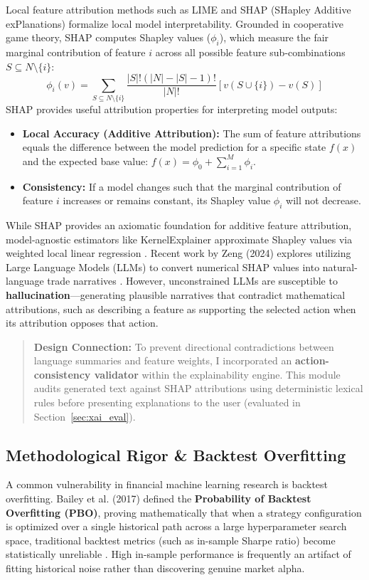 \documentclass[11pt,a4paper]{article}
\newenvironment{callout}{%
  \par\vspace{8pt}
  \noindent\makebox[\linewidth]{\rule{\linewidth}{0.6pt}}\vspace{-4pt}
  \begin{quote}\small
}{%
  \end{quote}\vspace{-6pt}
  \noindent\makebox[\linewidth]{\rule{\linewidth}{0.6pt}}\vspace{8pt}
}
\begin{document}
Local feature attribution methods such as LIME \cite{ribeiro2016} and SHAP (SHapley Additive exPlanations) \cite{lundberg2017,lundberg2020} formalize local model interpretability. Grounded in cooperative game theory, SHAP computes Shapley values ($\phi_i$), which measure the fair marginal contribution of feature $i$ across all possible feature sub-combinations $S \subseteq N \setminus \{i\}$:
\begin{equation}
\phi_i(v) = \sum_{S \subseteq N \setminus \{i\}} \frac{|S|!(|N| - |S| - 1)!}{|N|!} \left[ v(S \cup \{i\}) - v(S) \right]
\end{equation}
SHAP provides useful attribution properties for interpreting model outputs:
\begin{itemize}[leftmargin=2em]
    \item \textbf{Local Accuracy (Additive Attribution):} The sum of feature attributions equals the difference between the model prediction for a specific state $f(x)$ and the expected base value: $f(x) = \phi_0 + \sum_{i=1}^M \phi_i$.
    \item \textbf{Consistency:} If a model changes such that the marginal contribution of feature $i$ increases or remains constant, its Shapley value $\phi_i$ will not decrease.
\end{itemize}

While SHAP provides an axiomatic foundation for additive feature attribution, model-agnostic estimators like KernelExplainer approximate Shapley values via weighted local linear regression \cite{lundberg2017}. Recent work by Zeng (2024) explores utilizing Large Language Models (LLMs) to convert numerical SHAP values into natural-language trade narratives \cite{zeng2024}. However, unconstrained LLMs are susceptible to \textbf{hallucination}---generating plausible narratives that contradict mathematical attributions, such as describing a feature as supporting the selected action when its attribution opposes that action.

\begin{callout}
\textbf{Design Connection:} To prevent directional contradictions between language summaries and feature weights, I incorporated an \textbf{action-consistency validator} within the explainability engine. This module audits generated text against SHAP attributions using deterministic lexical rules before presenting explanations to the user (evaluated in Section~\ref{sec:xai_eval}).
\end{callout}

\subsection{Methodological Rigor \& Backtest Overfitting}
A common vulnerability in financial machine learning research is backtest overfitting. Bailey et al. (2017) defined the \textbf{Probability of Backtest Overfitting (PBO)}, proving mathematically that when a strategy configuration is optimized over a single historical path across a large hyperparameter search space, traditional backtest metrics (such as in-sample Sharpe ratio) become statistically unreliable \cite{bailey2014,harvey2015}. High in-sample performance is frequently an artifact of fitting historical noise rather than discovering genuine market alpha.
\end{document}
